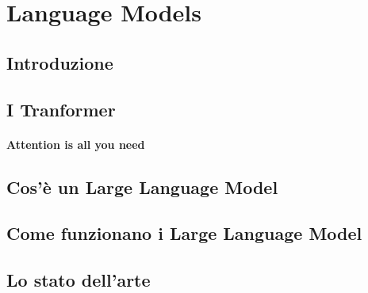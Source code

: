 \chapter{Language Models}
\label{Language_Models}
\section{Introduzione}
\section{I Tranformer}
\subsubsection[Attention is all you need]{Attention is all you need}
\section{Cos'è un Large Language Model}
\section{Come funzionano i Large Language Model}
\section{Lo stato dell'arte}